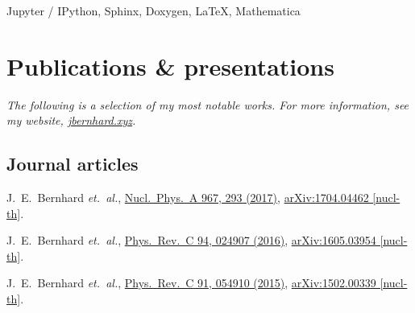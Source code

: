 \documentclass[letterpaper,10pt]{article}
\begin{document}
\begin{multicols}{2}
Jupyter / IPython, Sphinx, Doxygen, \LaTeX, Mathematica



\section{Publications \& presentations}

\vspace{-.5\parskip}
\emph{%
  \small
  The following is a selection of my most notable works.
  For more information, see my website, \href{https://jbernhard.xyz}{jbernhard.xyz}.
}
\vspace{-.5\parskip}



\subsection{Journal articles}

J.~E.~Bernhard \textit{et.\ al.},
\href{https://www.sciencedirect.com/science/article/pii/S0375947417301549}{Nucl.\ Phys.\ A 967, 293 (2017)},
\href{https://arxiv.org/abs/1704.04462}{arXiv:1704.04462 [nucl-th]}.

J.~E.~Bernhard \textit{et.\ al.},
\href{https://journals.aps.org/prc/abstract/10.1103/PhysRevC.94.024907}{Phys.\ Rev.\ C 94, 024907 (2016)},
\href{https://arxiv.org/abs/1605.03954}{arXiv:1605.03954 [nucl-th]}.

J.~E.~Bernhard \textit{et.\ al.},
\href{https://journals.aps.org/prc/abstract/10.1103/PhysRevC.91.054910}{Phys.\ Rev.\ C 91, 054910 (2015)},
\href{https://arxiv.org/abs/1502.00339}{arXiv:1502.00339 [nucl-th]}.


\end{multicols}
\end{document}
